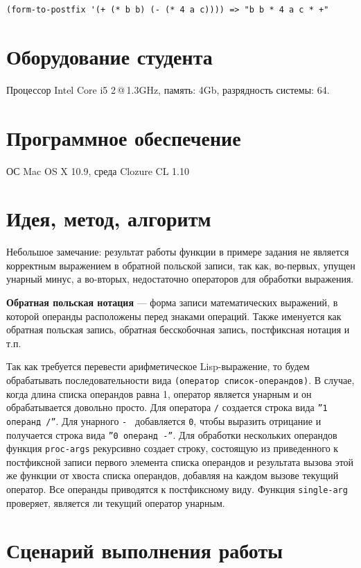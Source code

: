 \documentclass[a4paper, 12pt]{article}
\begin{document}
\begin{lstlisting}
(form-to-postfix '(+ (* b b) (- (* 4 a c)))) => "b b * 4 a c * +"
\end{lstlisting}

\section{Оборудование студента}
Процессор Intel Core i5 2\,@\,1.3GHz, память: 4Gb, разрядность системы: 64.


\section{Программное обеспечение}
ОС Mac OS X 10.9, среда Clozure CL 1.10


\section{Идея, метод, алгоритм}
Небольшое замечание: результат работы функции в примере задания не является корректным выражением в обратной польской записи, так как, во-первых, упущен унарный минус, а во-вторых, недостаточно операторов для обработки выражения.

{\bf Обратная польская нотация} — форма записи математических выражений, в которой операнды расположены перед знаками операций. Также именуется как обратная польская запись, обратная бесскобочная запись, постфиксная нотация и т.п.

Так как требуется перевести арифметическое Lisp-выражение, то будем обрабатывать последовательности вида {\tt (оператор список-операндов)}. В случае, когда длина списка операндов равна 1, оператор является унарным и он обрабатывается довольно просто. Для оператора {\tt /} создается строка вида {\tt ''1 операнд /''}. Для унарного {\tt - } добавляется {\tt 0}, чтобы выразить отрицание и получается строка вида {\tt ''0 операнд -''}. Для обработки нескольких операндов функция {\tt proc-args} рекурсивно создает строку, состоящую из приведенного к постфиксной записи первого элемента списка операндов и результата вызова этой же функции от хвоста списка операндов, добавляя на каждом вызове текущий оператор. Все операнды приводятся к постфиксному виду. Функция {\tt single-arg} проверяет, является ли текущий оператор унарным.


\section{Сценарий выполнения работы}
\end{document}
